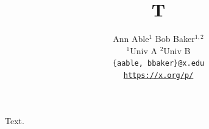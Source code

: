 \documentclass{article}
\title{T}
\author{Ann Able$^1$ \quad Bob Baker$^{1,2}$ \\[0.6em] $^1$Univ A \quad $^2$Univ B \\[0.5em] \texttt{\{aable, bbaker\}@x.edu} \\ [0.5em] {\tt\small \href{https://x.org/p/}{https://x.org/p/}}}
\begin{document}
\maketitle
Text.
\end{document}
